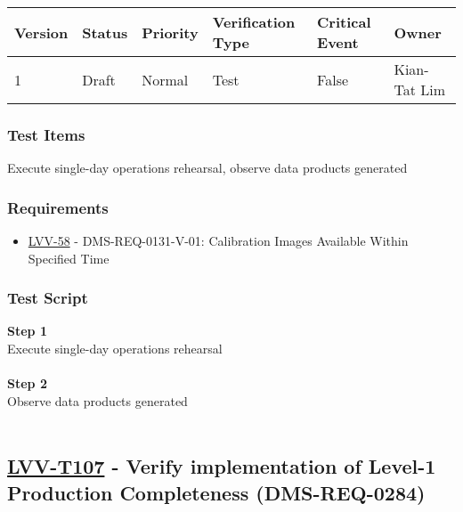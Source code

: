 \begin{longtable}[]{@{}llllll@{}}
\toprule
Version & Status & Priority & Verification Type & Critical Event &
Owner\tabularnewline
\midrule
\endhead
1 & Draft & Normal & Test & False & Kian-Tat Lim\tabularnewline
\bottomrule
\end{longtable}

\hypertarget{test-items-82}{%
\subsubsection{Test Items}\label{test-items-82}}

Execute single-day operations rehearsal, observe data products generated

\hypertarget{requirements-83}{%
\subsubsection{Requirements}\label{requirements-83}}

\begin{itemize}
\tightlist
\item
  \href{https://jira.lsstcorp.org/browse/LVV-58}{LVV-58} -
  DMS-REQ-0131-V-01: Calibration Images Available Within Specified Time
\end{itemize}

\hypertarget{test-script-83}{%
\subsubsection{Test Script}\label{test-script-83}}

\textbf{Step 1}\\
Execute single-day operations rehearsal\\
~\\
\textbf{Step 2}\\
\hspace*{0.333em}Observe data products generated\\
~\\

\hypertarget{lvv-t107---verify-implementation-of-level-1-production-completeness-dms-req-0284}{%
\subsection{\texorpdfstring{\href{https://jira.lsstcorp.org/secure/Tests.jspa\#/testCase/LVV-T107}{LVV-T107}
- Verify implementation of Level-1 Production Completeness
(DMS-REQ-0284)}{LVV-T107 - Verify implementation of Level-1 Production Completeness (DMS-REQ-0284)}}\label{lvv-t107---verify-implementation-of-level-1-production-completeness-dms-req-0284}}

